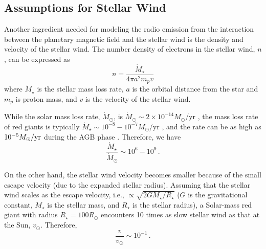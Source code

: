 \documentclass[iop,numberedappendix,apj]{emulateapj}
\begin{document}




\subsection{Assumptions for Stellar Wind}
\label{ss:stellarwind}

Another ingredient needed for modeling the radio emission from the interaction between the planetary magnetic field and the stellar wind is the density and velocity of the stellar wind. 
The number density of electrons in the stellar wind, $n$, can be expressed as
\begin{equation}
n = \frac{\dot M_\star}{4\pi a^2 m_p v}
\label{eq:n}
\end{equation}
where $\dot M_\star$ is the stellar mass loss rate, $a$ is the orbital distance from the star and $m_p$ is proton mass, and $v$ is the velocity of the stellar wind. 

While the solar mass loss rate, $\dot M_\odot$, is $\dot M_\odot \sim 2\times 10^{-14} M_{\odot}$/yr \citep[e.g.,][]{hundhausen1997}, the mass loss rate of red giants is typically $\dot M_\star \sim 10^{-8}-10^{-7} M_{\odot}$/yr \citep{reimers1975}, and the rate can be as high as $10^{-5} M_\odot{\rm /yr}$ during the AGB phase \citep{schild1989, vassiliadis1993, schoier2001, vanloon2005}.
Therefore, we have
\begin{equation}
\frac{\dot M_\star}{\dot M_{\odot}} \sim 10^6 - 10^9 \, . \label{eq:scale_Mdot}
\end{equation}

On the other hand, the stellar wind velocity becomes smaller because of the small escape velocity (due to the expanded stellar radius).
Assuming that the stellar wind scales as the escape velocity, i.e., $\propto \sqrt{2GM_{\star}/R_{\star}}$ ($G$ is the gravitational constant, $M_{\star}$ is the stellar mass, and $R_{\star}$ is the stellar radius), a Solar-mass red giant with radius $R_{\star}=100R_{\odot}$ encounters 10 times as slow stellar wind as that at the Sun, $v_{\odot}$.
Therefore, 
\begin{equation}
\frac{v}{v_{\odot}} \sim 10^{-1} \, . \label{eq:scale_v}
\end{equation}
\end{document}
